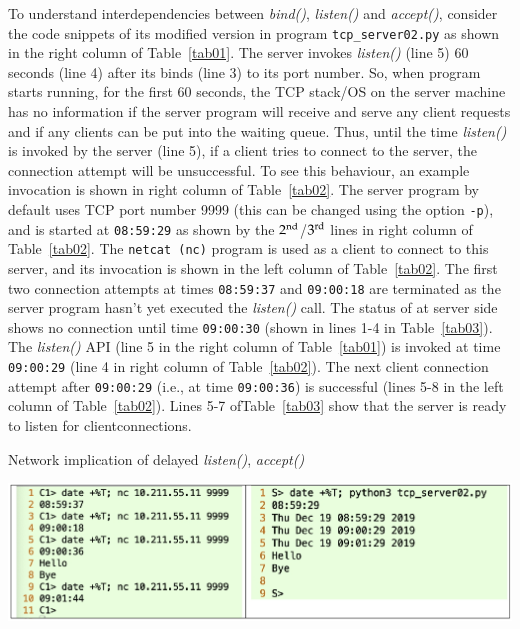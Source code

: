 \vspace{-.6cm}

\begin{multicols}{2}
To understand interdependencies between \textit{bind()}, \textit{listen()} and \textit{accept()}, consider the code snippets of its modified version in program \texttt{tcp\_server02.py} \cite{art1-key17} as shown in the right column of Table~\ref{tab01}. The server invokes \textit{listen()} (line 5) 60 seconds (line 4) after its binds (line 3) to its port number. So, when program starts running, for the first 60 seconds, the TCP stack/OS on the server machine has no information if the server program will receive and serve any client requests and if any clients can be put into the waiting queue. Thus, until the time \textit{listen()} is invoked by the server (line 5), if a client tries to connect to the server, the connection attempt will be unsuccessful. To see this behaviour, an example invocation is shown in right column of Table~\ref{tab02}. The server program by default uses TCP port number 9999 (this can be changed using the option \texttt{-p}), and is started at \texttt{08:59:29} as shown by the $2^{\rm nd}$/$3^{\rm rd}$ lines in right column of Table~\ref{tab02}. The \texttt{netcat (nc)} program \cite{art1-key18} is used as a client to connect to this server, and its invocation is shown in the left column of Table~\ref{tab02}. The first two connection attempts at times \texttt{08:59:37} and \texttt{09:00:18} are terminated as the server program hasn’t yet executed the \textit{listen()} call. The status of at server side shows no connection until time \texttt{09:00:30} (shown in lines 1-4 in Table~\ref{tab03}). The \textit{listen()} API (line 5 in the right column of Table~\ref{tab01}) is invoked at time \texttt{09:00:29} (line 4 in right column of Table~\ref{tab02}). The next client connection attempt after \texttt{09:00:29} (i.e., at time \texttt{09:00:36}) is successful (lines 5-8 in the left column of Table~\ref{tab02}). Lines 5-7 of\break Table~\ref{tab03} show that the server is ready to listen for client\break connections.
\end{multicols}

\begin{table}[H]

\vspace{-.7cm}

\centering
\caption{Network implication of delayed \textit{listen()}, \textit{accept()}}\label{tab02}
\includegraphics[scale=2.15]{src/Figures/chap1/tab02.jpg}
\end{table}

